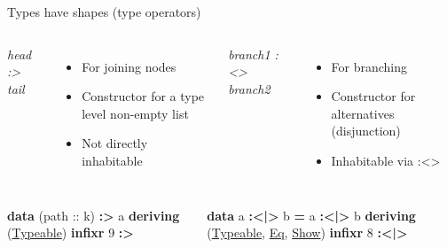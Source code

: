 \documentclass[ignorenonframetext,]{beamer}
\newenvironment{Shaded}{}{}
\newcommand{\KeywordTok}[1]{\textcolor[rgb]{0.26,0.66,0.93}{\textbf{{#1}}}}
\newcommand{\DataTypeTok}[1]{\underline{{#1}}}
\newcommand{\DecValTok}[1]{\textcolor[rgb]{0.27,0.67,0.26}{{#1}}}
\newcommand{\OtherTok}[1]{{#1}}
\newcommand{\FunctionTok}[1]{\textcolor[rgb]{1.00,0.58,0.35}{\textbf{{#1}}}}
\newcommand{\NormalTok}[1]{{#1}}
\begin{document}
\begin{frame}[fragile]{Types have shapes (type operators)}

\begin{columns}


\emph{head :\textgreater{} tail}

\begin{itemize}[<+->]
\itemsep1pt\parskip0pt
\item
  For joining nodes
\item
  Constructor for a type level non-empty list
\item
  Not directly inhabitable
\end{itemize}


\emph{branch1 :\textless{}\textbar{}\textgreater{} branch2}

\begin{itemize}[<+->]
\itemsep1pt\parskip0pt
\item
  For branching
\item
  Constructor for alternatives (disjunction)
\item
  Inhabitable via :\textless{}\textbar{}\textgreater{}
\end{itemize}

\end{columns}

\begin{columns}


\begin{Shaded}
\begin{Highlighting}[]
\KeywordTok{data} \NormalTok{(}\OtherTok{path ::} \NormalTok{k) }\FunctionTok{:>} \NormalTok{a}
    \KeywordTok{deriving} \NormalTok{(}\DataTypeTok{Typeable}\NormalTok{)}
    \KeywordTok{infixr} \DecValTok{9} \FunctionTok{:>}
\end{Highlighting}
\end{Shaded}


\begin{Shaded}
\begin{Highlighting}[]
\KeywordTok{data} \NormalTok{a }\FunctionTok{:<|>} \NormalTok{b }\FunctionTok{=} \NormalTok{a }\FunctionTok{:<|>} \NormalTok{b}
    \KeywordTok{deriving} \NormalTok{(}\DataTypeTok{Typeable}\NormalTok{, }\DataTypeTok{Eq}\NormalTok{, }\DataTypeTok{Show}\NormalTok{)}
\KeywordTok{infixr} \DecValTok{8} \FunctionTok{:<|>}
\end{Highlighting}
\end{Shaded}

\end{columns}

\end{frame}
\end{document}
